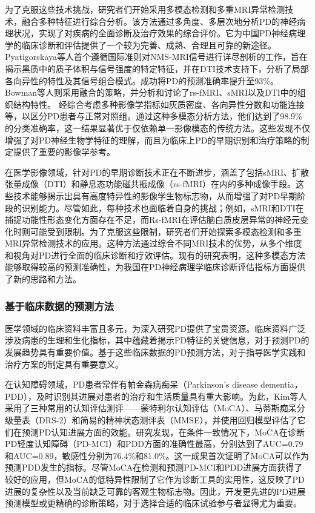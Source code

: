 为了克服这些技术挑战，研究者们开始采用多模态检测和多重MRI异常检测技术，融合多种特征进行综合分析。该方法通过多角度、多层次地分析PD的神经病理状况，实现了对疾病的全面诊断及治疗效果的综合评价。它为中国PD神经病理学的临床诊断和评估提供了一个较为完善、成熟、合理且可靠的新途径\cite{pyatigorskaya2018comparative,gu2016automatic,bowman2016multimodal}。Pyatigorskaya等人\cite{pyatigorskaya2018comparative}首个遵循国际准则对NMS-MRI信号进行详尽剖析的工作，旨在揭示黑质中的质子体积与信号强度的特定特征，并在DTI技术支持下，分析了局部各向异性的特性及其信号组合模式。成功将PD的预测准确率提升至93\%。Bowman等人\cite{bowman2016multimodal}则采用融合的策略，并分析和讨论了rs-fMRI、sMRI以及DTI中的组织结构特性。
经综合考虑多种影像学指标如灰质密度、各向异性分数和功能连接等，以区分PD患者与正常对照组。通过这种多模态分析方法，他们达到了98.9\%的分类准确率，这一结果显著优于仅依赖单一影像模态的传统方法。这些发现不仅增强了对PD神经生物学特征的理解，而且为临床上PD的早期识别和治疗策略的制定提供了重要的影像学参考。

在医学影像领域，针对PD的早期诊断技术正在不断进步，涵盖了包括sMRI、扩散张量成像（DTI）和静息态功能磁共振成像（rs-fMRI）在内的多种成像手段。这些技术能够揭示出具有高度特异性的影像学生物标志物，从而增强了对PD早期阶段的识别能力。尽管如此，每种技术也面临着自身的挑战；例如，sMRI和DTI在捕捉功能性形态变化方面存在不足，而Rs-fMRI在评估脑白质皮层异常的神经元变化时则可能受到限制。为了克服这些限制，研究者们开始探索多模态检测和多重MRI异常检测技术的应用。这种方法通过综合不同MRI技术的优势，从多个维度和视角对PD进行全面的临床诊断和疗效评估。现有的研究\cite{pyatigorskaya2018comparative,gu2016automatic,bowman2016multimodal}表明，这种多模态方法能够取得较高的预测准确性，为我国在PD神经病理学临床诊断评估指标方面提供了新的思路和方法。


\subsubsection{基于临床数据的预测方法}
医学领域的临床资料丰富且多元，为深入研究PD提供了宝贵资源。临床资料广泛涉及病患的生理和生化指标，其中蕴藏着揭示PD特征的关键信息，对于预测PD的发展趋势具有重要价值。基于这些临床数据的PD预测方法，对于指导医学实践和治疗方案的制定具有重要意义。

在认知障碍领域，PD患者常伴有帕金森病痴呆（Parkinson’s disease dementia，PDD），及时识别其进展对患者的治疗和生活质量具有重大影响。为此，Kim等人\cite{kim2019prediction}采用了三种常用的认知评估测评——蒙特利尔认知评估（MoCA）、马蒂斯痴呆分级量表（DRS-2）和简易的精神状态测评表（MMSE），并使用回归模型评估了它们在预测PD认知进展方面的效能。研究发现，在条件一致情况下，MoCA在诊断PD轻度认知障碍（PD-MCI）和PDD方面的准确性最高，分别达到了AUC=0.79和AUC=0.89，敏感性分别为76.4\%和81.0\%。这一成果首次证明了MoCA可以作为预测PDD发生的指标。尽管MoCA在检测和预测PD-MCI和PDD进展方面获得了较好的应用\cite{hu2014predictors,pigott2015longitudinal,marras2013measuring,hoops2009validity,dalrymple2010moca}，但MoCA的低特异性限制了它作为诊断工具的实用性\cite{marras2013measuring,hoops2009validity}，这反映了PD进展的复杂性以及当前缺乏可靠的客观生物标志物\cite{miller2015biomarkers}。因此，开发更先进的PD进展预测模型或更精确的诊断策略，对于选择合适的临床试验参与者显得尤为重要。

